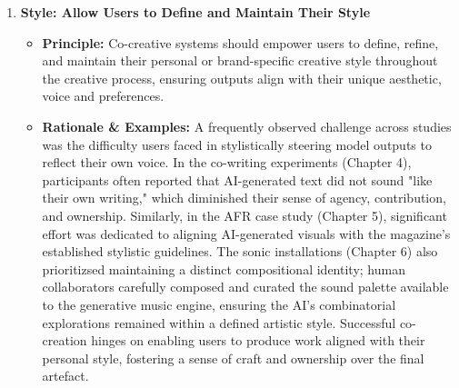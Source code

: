 \begin{enumerate}[label=\arabic*., wide, labelindent=0pt]
\item \textbf{Style: Allow Users to Define and Maintain Their Style}
    \begin{itemize}[label=\textbullet, leftmargin=*]
        \item \textbf{Principle:} Co-creative systems should empower users to define, refine, and maintain their personal or brand-specific creative style throughout the creative process, ensuring outputs align with their unique aesthetic, voice and preferences.
        \item \textbf{Rationale \& Examples:} A frequently observed challenge across studies was the difficulty users faced in stylistically steering model outputs to reflect their own voice. In the co-writing experiments (Chapter 4), participants often reported that AI-generated text did not sound "like their own writing," which diminished their sense of agency, contribution, and ownership. Similarly, in the AFR case study (Chapter 5), significant effort was dedicated to aligning AI-generated visuals with the magazine's established stylistic guidelines. The sonic installations (Chapter 6) also prioritizsed maintaining a distinct compositional identity; human collaborators carefully composed and curated the sound palette available to the generative music engine, ensuring the AI's combinatorial explorations remained within a defined artistic style. Successful co-creation hinges on enabling users to produce work aligned with their personal style, fostering a sense of craft and ownership over the final artefact.
    \end{itemize}


\end{enumerate}
